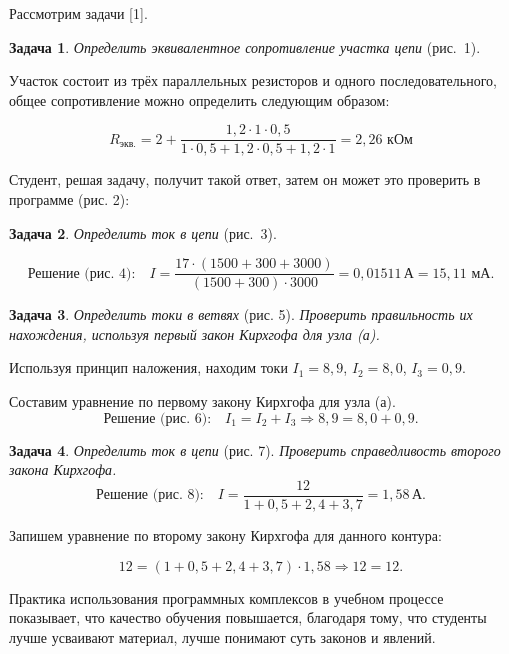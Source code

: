 Рассмотрим задачи [1].

\textbf{Задача 1}. \textit{Определить эквивалентное сопротивление участка цепи} (рис.~1).

Участок состоит из трёх параллельных резисторов и одного последовательного, общее сопротивление можно определить следующим образом:

$$R_{\text{экв.}}=2+\frac{1,2\cdot1\cdot0,5}{1\cdot0,5+1,2\cdot0,5+1,2\cdot1}=2,26\text{ кОм}$$

Студент, решая задачу, получит такой ответ, затем он может это проверить в программе (рис. 2):





\textbf{Задача 2}. \textit{Определить ток в цепи} (рис.~3).

$$\text{Решение (рис.~4):}\quad I=\frac{17\cdot(1500+300+3000)}{(1500+300)\cdot3000}=0,01511\,\text{А}=15,11\text{ мА.}$$

\vspace{-16pt}


\textbf{Задача 3}. \textit{Определить токи в ветвях} (рис. 5). \textit{Проверить правильность их нахождения, используя первый закон Кирхгофа для узла (а).}

Используя принцип наложения, находим токи $I_1=8,9$, $I_2=8,0$, $I_3=0,9$.

Составим уравнение по первому закону Кирхгофа для узла (а).
\vspace{-6pt}
$$\text{Решение (рис. 6):}\quad I_1=I_2+I_3\Rightarrow8,9=8,0+0,9.$$
\vspace{-8pt}

\clearpage

\textbf{Задача 4}. \textit{Определить ток в цепи} (рис. 7). \textit{Проверить справедливость второго закона Кирхгофа.}
\vspace{-2pt}
$$\text{Решение (рис.~8):}\quad I=\frac{12}{1+0,5+2,4+3,7}=1,58\,\text{А.}$$

Запишем уравнение по второму закону Кирхгофа для данного контура:

$$12=(1+0,5+2,4+3,7)\cdot1,58\Rightarrow12=12.$$



Практика использования программных комплексов в учебном процессе показывает, что качество обучения повышается, благодаря тому, что студенты лучше усваивают материал, лучше понимают суть законов и явлений.

